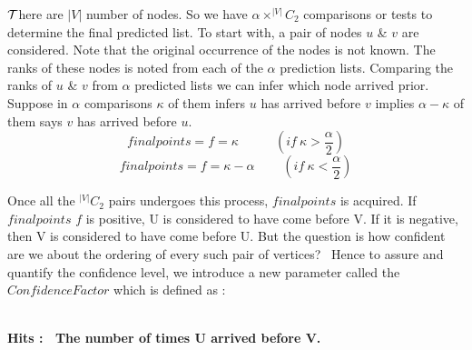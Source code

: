 \documentclass{article}
\begin{document}
$\cal T$here are $|V|$ number of nodes. So we have $\alpha \times ^{|V|}C_2$ comparisons or tests to determine the final predicted list. To start with, a pair of nodes $u$ \& $v$ are considered. Note that the original occurrence of the nodes is not known. The ranks of these nodes is noted from each of the $\alpha$ prediction lists. Comparing the ranks of $u$ \& $v$ from $\alpha$ predicted lists we can infer which node arrived prior. Suppose in $\alpha$ comparisons $\kappa$ of them infers $u$ has arrived before $v$ implies $\alpha - \kappa$ of them says $v$ has arrived before $u$.
\begin{equation}
finalpoints = f = \kappa\ \ \ \ \ \ \ \ \ \ \ \ \  (if\ \kappa > \frac{\alpha}{2})
\end{equation}
\begin{equation}
finalpoints = f = \kappa - \alpha\ \ \ \ \ \ \ \ \ \  (if\ \kappa < \frac{\alpha}{2})
\end{equation}

Once all the $^{|V|}C_2$ pairs undergoes this process, $finalpoints$ is acquired.
If $finalpoints$ $f$  is positive, U is considered to have come before V. If it is negative, then V is considered to have come before U. But the question is how confident are we about the ordering of every such pair of vertices?  Hence to assure and quantify the confidence level, we introduce a new parameter called the $Confidence Factor$ which is defined as : 
\\\

\bf Hits \rm:  The number of times U arrived before V.
\\\
\end{document}
